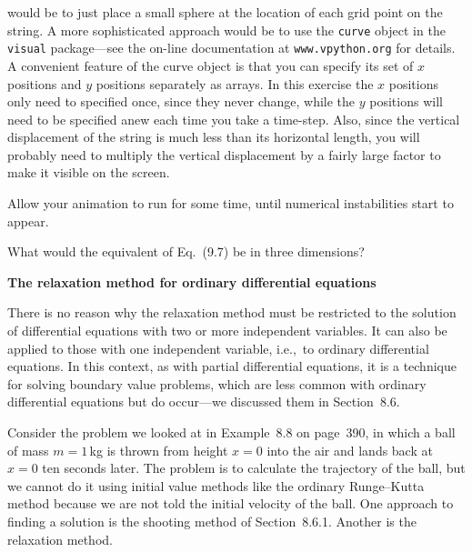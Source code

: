 \documentclass[12pt]{article}
\begin{document}
\begin{exercises}
\begin{enumerate}
  would be to just place a small sphere at the location of each grid point
  on the string.  A more sophisticated approach would be to use the
  \verb|curve| object in the \verb|visual| package---see the on-line
  documentation at \texttt{www.vpython.org} for details.  A convenient
  feature of the curve object is that you can specify its set of $x$
  positions and $y$ positions separately as arrays.  In this exercise the
  $x$ positions only need to specified once, since they never change, while
  the $y$ positions will need to be specified anew each time you take a
  time-step.  Also, since the vertical displacement of the string is much
  less than its horizontal length, you will probably need to multiply the
  vertical displacement by a fairly large factor to make it visible on the
  screen.

  Allow your animation to run for some time, until numerical instabilities
  start to appear.
\end{enumerate}



\exercise What would the equivalent of Eq.~(9.7) be in three dimensions?



\exercise \textbf{The relaxation method for ordinary differential
  equations}

\exskip There is no reason why the relaxation method must be restricted to
the solution of differential equations with two or more independent
variables.  It can also be applied to those with one independent variable,
i.e.,~to ordinary differential equations.  In this context, as with partial
differential equations, it is a technique for solving boundary value
problems, which are less common with ordinary differential equations but do
occur---we discussed them in Section~8.6.

Consider the problem we looked at in Example~8.8 on page~390, in which a
ball of mass $m=1\,$kg is thrown from height $x=0$ into the air and lands
back at $x=0$ ten seconds later.  The problem is to calculate the
trajectory of the ball, but we cannot do it using initial value methods
like the ordinary Runge--Kutta method because we are not told the initial
velocity of the ball.  One approach to finding a solution is the shooting
method of Section~8.6.1.  Another is the relaxation method.


\end{exercises}
\end{document}
